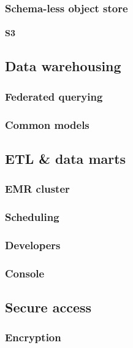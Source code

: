 \documentclass[10pt]{article}
\begin{document}
\subsubsection{Schema-less object store}
\paragraph{S3}

\subsection{Data warehousing}
\subsubsection{Federated querying}
\subsubsection{Common models}

\subsection{ETL \& data marts}
\subsubsection{EMR cluster}
\subsubsection{Scheduling}
\subsubsection{Developers}
\subsubsection{Console}

\subsection{Secure access}
\label{sec:secure_access}

\subsubsection{Encryption}
\end{document}
